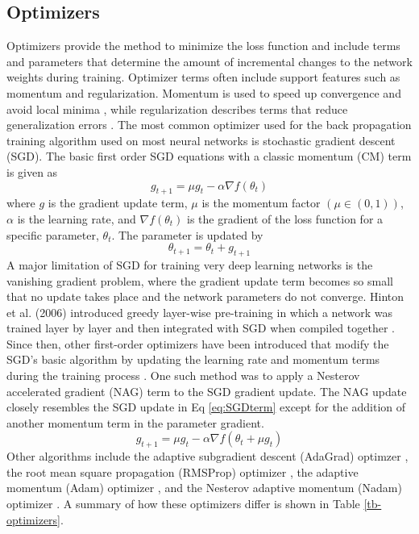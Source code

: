 \subsection{Optimizers}
Optimizers provide the method to minimize the loss function and include terms and parameters that determine the amount of incremental changes to the network weights during training. Optimizer terms often include support features such as momentum and regularization. Momentum is used to speed up convergence and avoid local minima \citep{Sutskever2013}, while regularization describes terms that reduce generalization errors \citep{Goodfellow2016}. The most common optimizer used for the back propagation training algorithm used on most neural networks is stochastic gradient descent (SGD). The basic first order SGD equations with a classic momentum (CM) term is given as
%
\begin{equation}
\label{eq:SGDterm}
g_{t+1} = \mu g_{t} - \alpha \nabla f (\theta_{t})
\end{equation}
%
\noindent
where $g$ is the gradient update term, $\mu$ is the momentum factor $(\mu \in (0,1))$, $\alpha$ is the learning rate, and $\nabla f (\theta_{t})$ is the gradient of the loss function for a specific parameter, $\theta_{t}$. The parameter is updated by
%
\begin{equation}
\label{eq:SGDupdate}
\theta_{t+1} = \theta_{t} + g_{t+1}
\end{equation}
%
A major limitation of SGD for training very deep learning networks is the vanishing gradient problem, where the gradient update term becomes so small that no update takes place and the network parameters do not converge. Hinton et al. (2006) introduced greedy layer-wise pre-training in which a network was trained layer by layer and then integrated with SGD when compiled together \citep{Hinton2006}. Since then, other first-order optimizers have been introduced that modify the SGD's basic algorithm by updating the learning rate and momentum terms during the training process \citep{Sutskever2013}.  One such method was to apply a Nesterov accelerated gradient (NAG) \citep{Nesterov1983} term to the SGD gradient update. The NAG update closely resembles the SGD update in Eq \ref{eq:SGDterm} except for the addition of another momentum term in the parameter gradient.
%
\begin{equation}
\label{eq:SGD-NAG}
g_{t+1} = \mu g_{t} - \alpha \nabla f (\theta_{t} + \mu g_{t})
\end{equation}
%
Other algorithms include the adaptive subgradient descent (AdaGrad) optimzer \citep{Duchi2011}, the root mean square propagation (RMSProp) optimizer \citep{Tieleman2012}, the adaptive momentum (Adam) optimizer \citep{Kingma2014}, and the Nesterov adaptive momentum (Nadam) optimizer \citep{Dozat2016}. A summary of how these optimizers differ is shown in Table \ref{tb-optimizers}.
